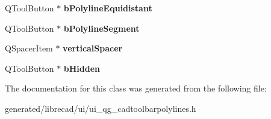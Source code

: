 \begin{DoxyCompactItemize}
\item 
\hypertarget{classUi__QG__CadToolBarPolylines_a02f70f3074ec5dcf2433c5f1648ee92c}{Q\-Tool\-Button $\ast$ {\bfseries b\-Polyline\-Equidistant}}\label{classUi__QG__CadToolBarPolylines_a02f70f3074ec5dcf2433c5f1648ee92c}

\item 
\hypertarget{classUi__QG__CadToolBarPolylines_ae891f6a6ee5e75ff4281010703a9bc82}{Q\-Tool\-Button $\ast$ {\bfseries b\-Polyline\-Segment}}\label{classUi__QG__CadToolBarPolylines_ae891f6a6ee5e75ff4281010703a9bc82}

\item 
\hypertarget{classUi__QG__CadToolBarPolylines_a3997ffe50d861ce47882c8a1e137645d}{Q\-Spacer\-Item $\ast$ {\bfseries vertical\-Spacer}}\label{classUi__QG__CadToolBarPolylines_a3997ffe50d861ce47882c8a1e137645d}

\item 
\hypertarget{classUi__QG__CadToolBarPolylines_a61be0b506c53d80878e4e738937c286b}{Q\-Tool\-Button $\ast$ {\bfseries b\-Hidden}}\label{classUi__QG__CadToolBarPolylines_a61be0b506c53d80878e4e738937c286b}

\end{DoxyCompactItemize}


The documentation for this class was generated from the following file\-:\begin{DoxyCompactItemize}
\item 
generated/librecad/ui/ui\-\_\-qg\-\_\-cadtoolbarpolylines.\-h\end{DoxyCompactItemize}

